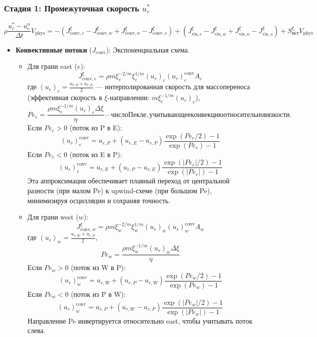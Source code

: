 \documentclass[a4paper,12pt]{article}
\begin{document}
\subsubsection*{Стадия 1: Промежуточная скорость \(u_r^*\)}
\[
\rho \frac{u_r^* - u_r^n}{\Delta t} V_{\text{phys}} = - (J_{\text{conv},e}^\xi - J_{\text{conv},w}^\xi + J_{\text{conv},n}^\xi - J_{\text{conv},s}^\xi) + (J_{\text{vis},e}^\xi - J_{\text{vis},w}^\xi + J_{\text{vis},n}^\xi - J_{\text{vis},s}^\xi) + S_{\text{ист}}^\xi V_{\text{phys}}
\]
\begin{itemize}
    \item \textbf{Конвективные потоки} (\(J_{\text{conv}}\)): Экспоненциальная схема.
    \begin{itemize}
        \item Для грани east (\(e\)):
        \[
        J_{\text{conv},e}^\xi = \rho m \xi_e^{-2/m} \xi_e^{1/m} (u_r)_e (u_r)_e^{\text{conv}} A_e
        \]
        где \((u_r)_e = \frac{u_{r,P} + u_{r,E}}{2}\) — интерполированная скорость для массопереноса (эффективная скорость в \(\xi\)-направлении: \(m \xi_e^{-1/m} (u_r)_e\)),
        \[
        Pe_e = \frac{\rho m \xi_e^{-1/m} (u_r)_e \Delta \xi}{\eta} — число Пекле, учитывающее конвекцию относительно вязкости.
        \]
        Если \(Pe_e > 0\) (поток из P в E):
        \[
        (u_r)_e^{\text{conv}} = u_{r,P} + (u_{r,E} - u_{r,P}) \frac{\exp(Pe_e / 2) - 1}{\exp(Pe_e) - 1}
        \]
        Если \(Pe_e < 0\) (поток из E в P):
        \[
        (u_r)_e^{\text{conv}} = u_{r,E} + (u_{r,P} - u_{r,E}) \frac{\exp(|Pe_e| / 2) - 1}{\exp(|Pe_e|) - 1}
        \]
        Эта аппроксимация обеспечивает плавный переход от центральной разности (при малом Pe) к upwind-схеме (при большом Pe), минимизируя осцилляции и сохраняя точность.

        \item Для грани west (\(w\)):
        \[
        J_{\text{conv},w}^\xi = \rho m \xi_w^{-2/m} \xi_w^{1/m} (u_r)_w (u_r)_w^{\text{conv}} A_w
        \]
        где \((u_r)_w = \frac{u_{r,W} + u_{r,P}}{2}\),
        \[
        Pe_w = \frac{\rho m \xi_w^{-1/m} (u_r)_w \Delta \xi}{\eta}
        \]
        Если \(Pe_w > 0\) (поток из W в P):
        \[
        (u_r)_w^{\text{conv}} = u_{r,W} + (u_{r,P} - u_{r,W}) \frac{\exp(Pe_w / 2) - 1}{\exp(Pe_w) - 1}
        \]
        Если \(Pe_w < 0\) (поток из P в W):
        \[
        (u_r)_w^{\text{conv}} = u_{r,P} + (u_{r,W} - u_{r,P}) \frac{\exp(|Pe_w| / 2) - 1}{\exp(|Pe_w|) - 1}
        \]
        Направление Pe инвертируется относительно east, чтобы учитывать поток слева.


\end{itemize}
\end{itemize}
\end{document}
